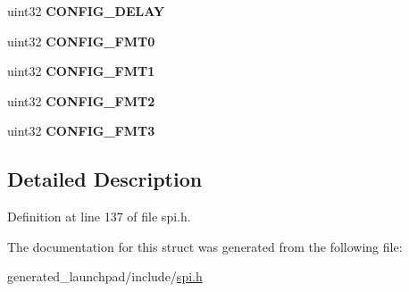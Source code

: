 \begin{DoxyCompactItemize}
uint32 {\bfseries C\+O\+N\+F\+I\+G\+\_\+\+D\+E\+L\+AY}
\item 
\mbox{\label{structspi__config__reg_a1cd53c8f775c6cff866a39f6df239c06}} 
uint32 {\bfseries C\+O\+N\+F\+I\+G\+\_\+\+F\+M\+T0}
\item 
\mbox{\label{structspi__config__reg_aeefbcb1b7d59b20c0888fb1a93c080a1}} 
uint32 {\bfseries C\+O\+N\+F\+I\+G\+\_\+\+F\+M\+T1}
\item 
\mbox{\label{structspi__config__reg_a551af4494efdc587b352efe46439bf56}} 
uint32 {\bfseries C\+O\+N\+F\+I\+G\+\_\+\+F\+M\+T2}
\item 
\mbox{\label{structspi__config__reg_ab853765e9fc9689edac33e8a73ae8b1d}} 
uint32 {\bfseries C\+O\+N\+F\+I\+G\+\_\+\+F\+M\+T3}
\end{DoxyCompactItemize}


\subsection{Detailed Description}


Definition at line 137 of file spi.\+h.



The documentation for this struct was generated from the following file\+:\begin{DoxyCompactItemize}
\item 
generated\+\_\+launchpad/include/\mbox{\hyperlink{spi_8h}{spi.\+h}}\end{DoxyCompactItemize}
